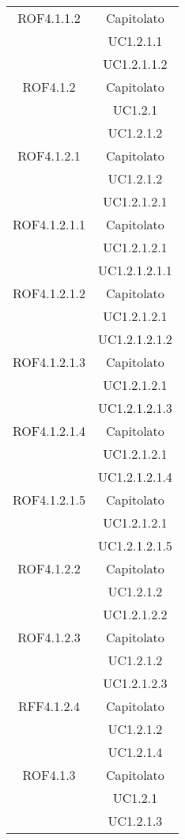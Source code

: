\begin{longtable}{|c|c|}
\midrule
ROF4.1.1.2
& Capitolato\\
& UC1.2.1.1\\
& UC1.2.1.1.2\\

\midrule
ROF4.1.2
& Capitolato\\
& UC1.2.1\\
& UC1.2.1.2\\

\midrule
ROF4.1.2.1
& Capitolato\\
& UC1.2.1.2\\
& UC1.2.1.2.1\\

\midrule
ROF4.1.2.1.1
& Capitolato\\
& UC1.2.1.2.1\\
& UC1.2.1.2.1.1\\

\midrule
ROF4.1.2.1.2
& Capitolato\\
& UC1.2.1.2.1\\
& UC1.2.1.2.1.2\\

\midrule
ROF4.1.2.1.3
& Capitolato\\
& UC1.2.1.2.1\\
& UC1.2.1.2.1.3\\

\midrule
ROF4.1.2.1.4
& Capitolato\\
& UC1.2.1.2.1\\
& UC1.2.1.2.1.4\\

\midrule
ROF4.1.2.1.5
& Capitolato\\
& UC1.2.1.2.1\\
& UC1.2.1.2.1.5\\

\midrule
ROF4.1.2.2
& Capitolato\\
& UC1.2.1.2\\
& UC1.2.1.2.2\\

\midrule
ROF4.1.2.3
& Capitolato\\
& UC1.2.1.2\\
& UC1.2.1.2.3\\

\midrule
RFF4.1.2.4
& Capitolato\\
& UC1.2.1.2\\
& UC1.2.1.4\\

\midrule
ROF4.1.3
& Capitolato\\
& UC1.2.1\\
& UC1.2.1.3\\


\end{longtable}
